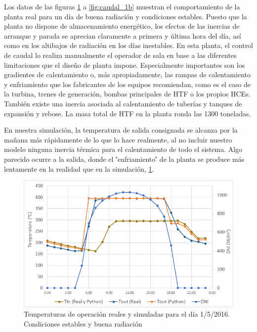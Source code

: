 Los datos de las figuras \ref{fig:temperatura_1b} a \ref{fig:caudal_1b} muestran el comportamiento de la planta real para un día de buena radiación y condiciones estables. Puesto que la planta no dispone de almacenamiento energético, los efectos de las inercias de arranque y parada se aprecian claramente a primera y última hora del día, así como en los altibajos de radiación en los días inestables. En esta planta, el control de caudal lo realiza manualmente el operador de sala en base a las diferentes limitaciones que el diseño de planta impone. Especialmente importantes son los gradientes de calentamiento o, más apropiadamente, las rampas de calentamiento y enfriamiento que los fabricantes de los equipos recomiendan, como es el caso de la turbina, trenes de generación, bombas principales de HTF o los propios HCEs. También existe una inercia asociada al calentamiento de tuberías y tanques de expansión y rebose.  La masa total de HTF en la planta ronda las 1300 toneladas. 

En nuestra simulación, la temperatura de salida consignada se alcanza por la mañana más rápidamente de lo que lo hace realmente, al no incluir nuestro modelo ninguna inercia térmica para el calentamiento de todo el sistema. Algo parecido ocurre a la salida, donde el \''enfriamiento\'' de la planta se produce más lentamente en la realidad que en la simulación, \ref{fig:temperatura_1b}.

\begin{figure}[H]
\includegraphics[width=0.9\linewidth]{images/temperatura_aste1b_01052016.png}
\caption[Temperaturas de operación reales y simuladas en un día de condiciones estables]{Temperaturas de operación reales y simuladas para el día 1/5/2016. Condiciones estables y buena radiación} 
\label{fig:temperatura_1b}
\end{figure}

